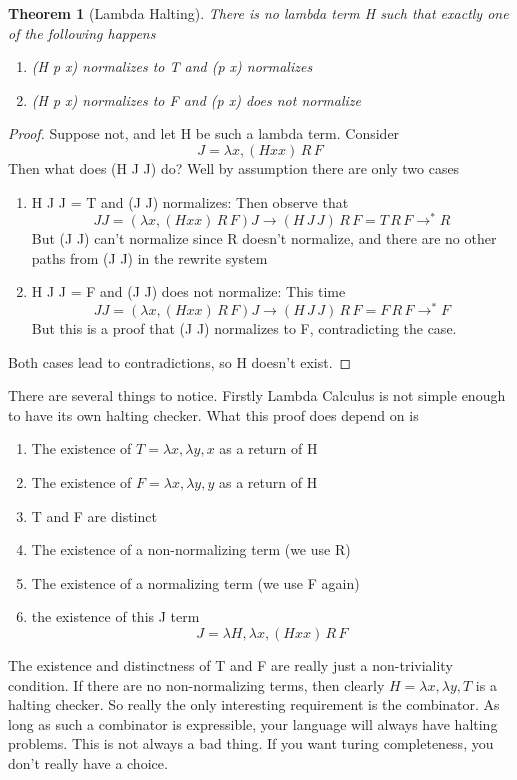 \documentclass[12pt]{article}
\newtheorem{theorem}{Theorem}
\begin{document}
\begin{theorem}[Lambda Halting]
There is no lambda term H such that exactly one of the following happens
\begin{enumerate}
    \item (H p x) normalizes to T and (p x) normalizes
    \item (H p x) normalizes to F and (p x) does not normalize
\end{enumerate}
\end{theorem}
\begin{proof}
Suppose not, and let H be such a lambda term. Consider 
\[
  J = \lambda x, (H x x)\, R\, F
\]
\noindent Then what does (H J J) do? Well by assumption there are only two cases
\begin{enumerate}
    \item H J J = T and (J J) normalizes: Then observe that
    \[
J J = (\lambda x, (H x x)\, R\, F) J \rightarrow
  (H\, J\, J)\, R \, F = T\, R\, F \rightarrow^* R 
    \]
    But (J J) can't normalize since R doesn't normalize, and there are no other paths from (J J) in the rewrite system
    \item H J J = F and (J J) does not normalize: This time
    \[
J J = (\lambda x, (H x x)\, R\, F) J \rightarrow
  (H\, J\, J)\, R \, F = F\, R\, F \rightarrow^* F 
    \]
    But this is a proof that (J J) normalizes to F, contradicting the case. 
\end{enumerate}
\noindent Both cases lead to contradictions, so H doesn't exist.
\end{proof}
\noindent There are several things to notice. Firstly Lambda Calculus is not simple enough to have its own halting checker.
What this proof does depend on is
\begin{enumerate}
    \item The existence of $T = \lambda x, \lambda y, x$ as a return of H
    \item The existence of $F = \lambda x, \lambda y, y$ as a return of H
    \item T and F are distinct
    \item The existence of a non-normalizing term (we use R)
    \item The existence of a normalizing term (we use F again)
    \item the existence of this J term
    \[
     J = \lambda H, \lambda x, (H x x)\, R\, F
    \]
\end{enumerate}
The existence and distinctness of T and F are really just a non-triviality condition.
If there are no non-normalizing terms, then clearly $H =\lambda x, \lambda y, T$ is a halting checker.
So really the only interesting requirement is the combinator.
As long as such a combinator is expressible, your language will always have halting problems.
This is not always a bad thing. 
If you want turing completeness, you don't really have a choice.
\end{document}
